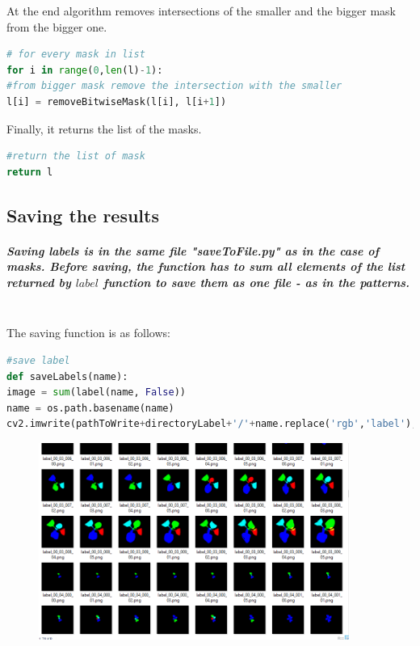 \documentclass[12pt]{article}
\begin{document}
\newpage

At the end algorithm removes intersections of the smaller and the bigger mask from the bigger one.

\begin{lstlisting}[language=Python]
# for every mask in list
for i in range(0,len(l)-1):
#from bigger mask remove the intersection with the smaller
l[i] = removeBitwiseMask(l[i], l[i+1])
\end{lstlisting}

Finally, it returns the list of the masks.

\begin{lstlisting}[language=Python]
#return the list of mask
return l
\end{lstlisting}


\subsection{Saving the results}

\subparagraph{
Saving labels is in the same file "saveToFile.py" as in the case of masks. Before saving, the function has to sum all elements of the list returned by $label$ function to save them as one file - as in the patterns.\\\\
}

The saving function is as follows:

\begin{lstlisting}[language=Python]
#save label
def saveLabels(name):
image = sum(label(name, False))
name = os.path.basename(name)
cv2.imwrite(pathToWrite+directoryLabel+'/'+name.replace('rgb','label'), image)
\end{lstlisting}

\begin{center}
\begin{figure}[H]
\centering
\includegraphics[width = 4in]{directory3.png}
\end{figure}
\end{center}
\end{document}
